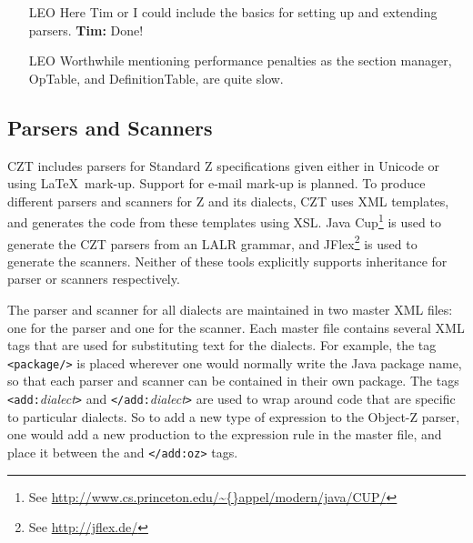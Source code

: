 \documentclass{llncs}
\begin{document}

  \begin{itemize}
    \item[LEO] Here Tim or I could include the basics for setting up
               and extending parsers. {\bf Tim:} Done!
    \item[LEO] Worthwhile mentioning performance penalties as the
               section manager, OpTable, and DefinitionTable, are
               quite slow.
  \end{itemize}


\subsection{Parsers and Scanners}

  CZT includes parsers for Standard Z specifications given either in
  Unicode or using \LaTeX\ mark-up.  Support for e-mail mark-up is
  planned. To produce different parsers and scanners for Z and its
  dialects, CZT uses XML templates, and generates the code from these
  templates using XSL. Java Cup\footnote{See
  \url{http://www.cs.princeton.edu/\~{}appel/modern/java/CUP/}} is
  used to generate the CZT parsers from an LALR grammar, and
  JFlex\footnote{See \url{http://jflex.de/}} is used to generate the
  scanners. Neither of these tools explicitly supports inheritance for
  parser or scanners respectively.

The parser and scanner for all dialects are maintained in two master
XML files: one for the parser and one for the scanner. Each master
file contains several XML tags that are used for substituting text for
the dialects. For example, the tag {\tt <package/>} is placed wherever
one would normally write the Java package name, so that each parser
and scanner can be contained in their own package. The tags {\tt
<add:}{\em dialect}{\tt >} and {\tt </add:}{\em dialect}{\tt >} are
used to wrap around code that are specific to particular dialects. So
to add a new type of expression to the Object-Z parser, one would add
a new production to the expression rule in the master file, and place
it between the {\tt <add:oz>} and {\tt </add:oz>} tags.
\end{document}
